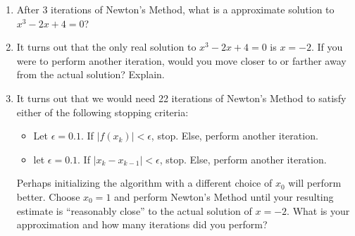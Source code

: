 \documentclass[12pt]{article}
\newif\ifans
\begin{document}
\begin{enumerate}
\begin{enumerate}
\begin{itemize}
\end{itemize}

\item After 3 iterations of Newton's Method, what is a approximate solution to $x^3-2x+4=0$?

\ifans{\fbox{$x_3=-\frac{34}{145}\approx-.2344827586$}} \fi

\item It turns out that the only real solution to $x^3-2x+4=0$ is $x=-2$.  If you were to perform another iteration, would you move closer to or farther away from the actual solution?  Explain.

\ifans{\fbox{\parbox{1\linewidth}{You would move further away.  The tangent line to the graph of $f(x)$ at $x_3$ will intersect the positive $x$-axis. }}} \fi

\item It turns out that we would need 22 iterations of Newton's Method to satisfy either of the following stopping criteria:

\begin{itemize}

\item Let $\epsilon=0.1$. If $|f(x_k)|<\epsilon$, stop.  Else, perform another iteration.

\item  let $\epsilon=0.1$.  If $|x_k-x_{k-1}|<\epsilon$, stop.  Else, perform another iteration.

\end{itemize}

Perhaps initializing the algorithm with a different choice of $x_0$ will perform better.  Choose $x_0=1$ and perform Newton's Method until your resulting estimate is ``reasonably close'' to the actual solution of $x=-2$. What is your approximation and how many iterations did you perform?


\end{enumerate}
\end{enumerate}
\end{document}

